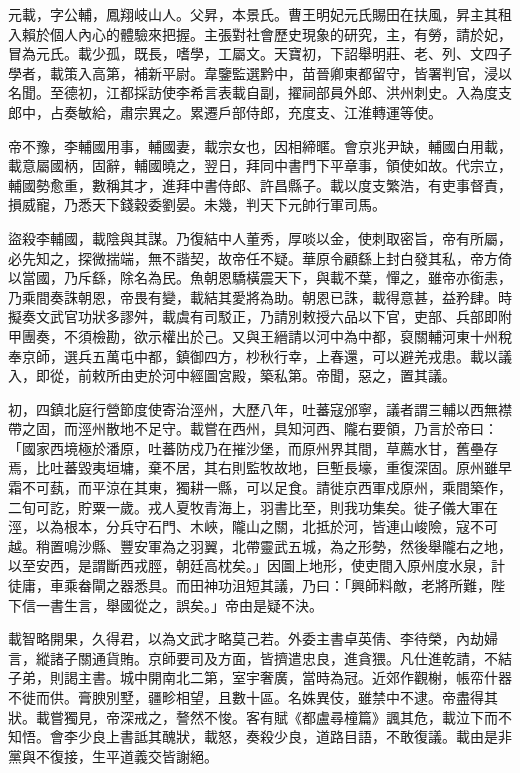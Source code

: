 
\begin{pinyinscope}

 元載，字公輔，鳳翔岐山人。父昇，本景氏。曹王明妃元氏賜田在扶風，昇主其租入賴於個人內心的體驗來把握。主張對社會歷史現象的研究，主，有勞，請於妃，冒為元氏。載少孤，既長，嗜學，工屬文。天寶初，下詔舉明莊、老、列、文四子學者，載策入高第，補新平尉。韋鑒監選黔中，苗晉卿東都留守，皆署判官，浸以名聞。至德初，江都採訪使李希言表載自副，擢祠部員外郎、洪州刺史。入為度支郎中，占奏敏給，肅宗異之。累遷戶部侍郎，充度支、江淮轉運等使。



 帝不豫，李輔國用事，輔國妻，載宗女也，因相締暱。會京兆尹缺，輔國白用載，載意屬國柄，固辭，輔國曉之，翌日，拜同中書門下平章事，領使如故。代宗立，輔國勢愈重，數稱其才，進拜中書侍郎、許昌縣子。載以度支繁浩，有吏事督責，損威寵，乃悉天下錢穀委劉晏。未幾，判天下元帥行軍司馬。



 盜殺李輔國，載陰與其謀。乃復結中人董秀，厚啖以金，使刺取密旨，帝有所屬，必先知之，探微揣端，無不諧契，故帝任不疑。華原令顧繇上封白發其私，帝方倚以當國，乃斥繇，除名為民。魚朝恩驕橫震天下，與載不葉，憚之，雖帝亦銜恚，乃乘間奏誅朝恩，帝畏有變，載結其愛將為助。朝恩已誅，載得意甚，益矜肆。時擬奏文武官功狀多謬舛，載虞有司駁正，乃請別敕授六品以下官，吏部、兵部即附甲團奏，不須檢勘，欲示權出於己。又與王縉請以河中為中都，裒關輔河東十州稅奉京師，選兵五萬屯中都，鎮御四方，杪秋行幸，上春還，可以避羌戎患。載以議入，即從，前敕所由吏於河中經圖宮殿，築私第。帝聞，惡之，置其議。



 初，四鎮北庭行營節度使寄治涇州，大歷八年，吐蕃寇邠寧，議者謂三輔以西無襟帶之固，而涇州散地不足守。載嘗在西州，具知河西、隴右要領，乃言於帝曰：「國家西境極於潘原，吐蕃防戍乃在摧沙堡，而原州界其間，草薦水甘，舊壘存焉，比吐蕃毀夷垣墉，棄不居，其右則監牧故地，巨塹長壕，重復深固。原州雖早霜不可蓺，而平涼在其東，獨耕一縣，可以足食。請徙京西軍戍原州，乘間築作，二旬可訖，貯粟一歲。戎人夏牧青海上，羽書比至，則我功集矣。徙子儀大軍在涇，以為根本，分兵守石門、木峽，隴山之關，北抵於河，皆連山峻險，寇不可越。稍置鳴沙縣、豐安軍為之羽翼，北帶靈武五城，為之形勢，然後舉隴右之地，以至安西，是謂斷西戎脛，朝廷高枕矣。」因圖上地形，使吏間入原州度水泉，計徒庸，車乘畚閘之器悉具。而田神功沮短其議，乃曰：「興師料敵，老將所難，陛下信一書生言，舉國從之，誤矣。」帝由是疑不決。



 載智略開果，久得君，以為文武才略莫己若。外委主書卓英倩、李待榮，內劫婦言，縱諸子關通貨賄。京師要司及方面，皆擠遣忠良，進貪猥。凡仕進乾請，不結子弟，則謁主書。城中開南北二第，室宇奢廣，當時為冠。近郊作觀榭，帳帟什器不徙而供。膏腴別墅，疆畛相望，且數十區。名姝異伎，雖禁中不逮。帝盡得其狀。載嘗獨見，帝深戒之，謷然不悛。客有賦《都盧尋橦篇》諷其危，載泣下而不知悟。會李少良上書詆其醜狀，載怒，奏殺少良，道路目語，不敢復議。載由是非黨與不復接，生平道義交皆謝絕。




\end{pinyinscope}
